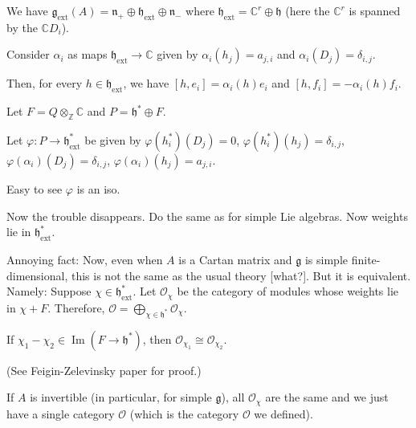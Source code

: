 \documentclass[etingof-lie.tex]{subfiles}
\begin{document}
We have $\mathfrak{g}_{\operatorname*{ext}}\left(  A\right)  =\mathfrak{n}%
_{+}\oplus\mathfrak{h}_{\operatorname*{ext}}\oplus\mathfrak{n}_{-}$ where
$\mathfrak{h}_{\operatorname*{ext}}=\mathbb{C}^{r}\oplus\mathfrak{h}$ (here
the $\mathbb{C}^{r}$ is spanned by the $\mathbb{C}D_{i}$).

Consider $\alpha_{i}$ as maps $\mathfrak{h}_{\operatorname*{ext}}%
\rightarrow\mathbb{C}$ given by $\alpha_{i}\left(  h_{j}\right)  =a_{j,i}$ and
$\alpha_{i}\left(  D_{j}\right)  =\delta_{i,j}$.

Then, for every $h\in\mathfrak{h}_{\operatorname*{ext}}$, we have $\left[
h,e_{i}\right]  =\alpha_{i}\left(  h\right)  e_{i}$ and $\left[
h,f_{i}\right]  =-\alpha_{i}\left(  h\right)  f_{i}$.

Let $F=Q\otimes_{\mathbb{Z}}\mathbb{C}$ and $P=\mathfrak{h}^{\ast}\oplus F$.

Let $\varphi:P\rightarrow\mathfrak{h}_{\operatorname*{ext}}^{\ast}$ be given
by $\varphi\left(  h_{i}^{\ast}\right)  \left(  D_{j}\right)  =0$,
$\varphi\left(  h_{i}^{\ast}\right)  \left(  h_{j}\right)  =\delta_{i,j}$,
$\varphi\left(  \alpha_{i}\right)  \left(  D_{j}\right)  =\delta_{i,j}$,
$\varphi\left(  \alpha_{i}\right)  \left(  h_{j}\right)  =a_{j,i}$.

Easy to see $\varphi$ is an iso.

Now the trouble disappears. Do the same as for simple Lie algebras. Now
weights lie in $\mathfrak{h}_{\operatorname*{ext}}^{\ast}$.

Annoying fact: Now, even when $A$ is a Cartan matrix and $\mathfrak{g}$ is
simple finite-dimensional, this is not the same as the usual theory [what?].
But it is equivalent. Namely: Suppose $\chi\in\mathfrak{h}%
_{\operatorname*{ext}}^{\ast}$. Let $\mathcal{O}_{\chi}$ be the category of
modules whose weights lie in $\chi+F$. Therefore, $\mathcal{O}=\bigoplus
\limits_{\chi\in\mathfrak{h}^{\ast}}\mathcal{O}_{\chi}$.

\begin{proposition}
If $\chi_{1}-\chi_{2}\in\operatorname*{Im}\left(  F\rightarrow\mathfrak{h}%
^{\ast}\right)  $, then $\mathcal{O}_{\chi_{1}}\cong\mathcal{O}_{\chi_{2}}$.
\end{proposition}

(See Feigin-Zelevinsky paper for proof.)

If $A$ is invertible (in particular, for simple $\mathfrak{g}$), all
$\mathcal{O}_{\chi}$ are the same and we just have a single category
$\mathcal{O}$ (which is the category $\mathcal{O}$ we defined).
\end{document}
